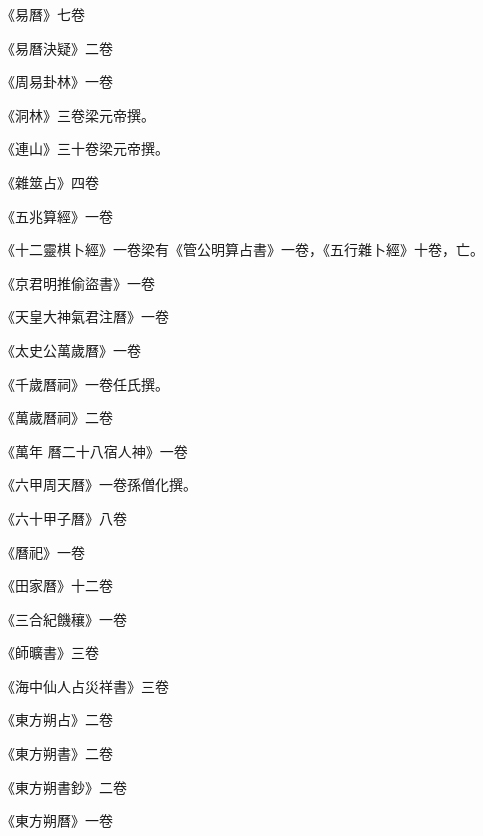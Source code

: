 \begin{pinyinscope}
 《易曆》七卷



 《易曆決疑》二卷



 《周易卦林》一卷



 《洞林》三卷梁元帝撰。



 《連山》三十卷梁元帝撰。



 《雜筮占》四卷



 《五兆算經》一卷



 《十二靈棋卜經》一卷梁有《管公明算占書》一卷，《五行雜卜經》十卷，亡。



 《京君明推偷盜書》一卷



 《天皇大神氣君注曆》一卷



 《太史公萬歲曆》一卷



 《千歲曆祠》一卷任氏撰。



 《萬歲曆祠》二卷



 《萬年
 曆二十八宿人神》一卷



 《六甲周天曆》一卷孫僧化撰。



 《六十甲子曆》八卷



 《曆祀》一卷



 《田家曆》十二卷



 《三合紀饑穰》一卷



 《師曠書》三卷



 《海中仙人占災祥書》三卷



 《東方朔占》二卷



 《東方朔書》二卷



 《東方朔書鈔》二卷



 《東方朔曆》一卷




\end{pinyinscope}
